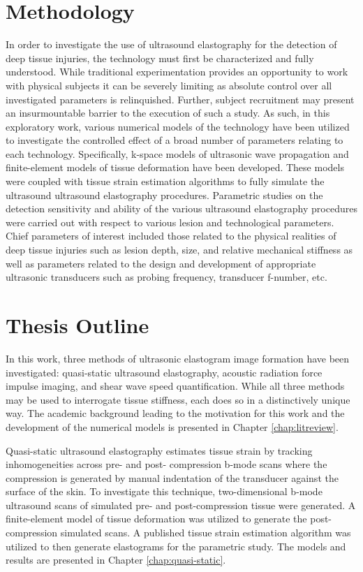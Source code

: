	\section{Methodology}
		In order to investigate the use of ultrasound elastography for the detection of deep tissue injuries, the technology must first be characterized and fully understood. While traditional experimentation provides an opportunity to work with physical subjects it can be severely limiting as absolute control over all investigated parameters is relinquished. Further, subject recruitment may present an insurmountable barrier to the execution of such a study. As such, in this exploratory work, various numerical models of the technology have been utilized to investigate the controlled effect of a broad number of parameters relating to each technology. Specifically, k-space models of ultrasonic wave propagation and finite-element models of tissue deformation have been developed. These models were coupled with tissue strain estimation algorithms to fully simulate the ultrasound ultrasound elastography procedures. Parametric studies on the detection sensitivity and ability of the various ultrasound elastography procedures were carried out with respect to various lesion and technological parameters. Chief parameters of interest included those related to the physical realities of deep tissue injuries such as lesion depth, size, and relative mechanical stiffness as well as parameters related to the design and development of appropriate ultrasonic transducers such as probing frequency, transducer f-number, etc.

	\section{Thesis Outline}
		In this work, three methods of ultrasonic elastogram image formation have been investigated: quasi-static ultrasound elastography, acoustic radiation force impulse imaging, and shear wave speed quantification. While all three methods may be used to interrogate tissue stiffness, each does so in a distinctively unique way. The academic background leading to the motivation for this work and the development of the numerical models is presented in Chapter \ref{chap:litreview}.

		Quasi-static ultrasound elastography estimates tissue strain by tracking inhomogeneities across pre- and post- compression b-mode scans where the compression is generated by manual indentation of the transducer against the surface of the skin. To investigate this technique, two-dimensional b-mode ultrasound scans of simulated pre- and post-compression tissue were generated. A finite-element model of tissue deformation was utilized to generate the post-compression simulated scans. A published tissue strain estimation algorithm was utilized to then generate elastograms for the parametric study. The models and results are presented in Chapter \ref{chap:quasi-static}.

